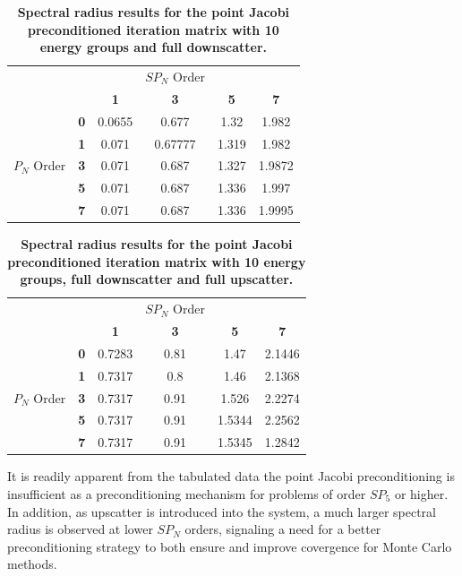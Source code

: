 \begin{table}[t!]
  \begin{center}
    \begin{tabular}{cccccc}\hline\hline
      \multicolumn{1}{c}{}& 
      \multicolumn{1}{c}{}& 
      \multicolumn{1}{c}{}& 
      \multicolumn{1}{c}{$SP_N$ Order}& 
      \multicolumn{1}{c}{}& 
      \multicolumn{1}{c}{} \\
       &   & \textbf{1} & \textbf{3} & \textbf{5} & \textbf{7}  \\
       & \textbf{0} & 0.0655 & 0.677 & 1.32 & 1.982 \\
       & \textbf{1} & 0.071 & 0.67777 & 1.319 & 1.982 \\
      $P_N$ Order & \textbf{3} & 0.071 & 0.687 & 1.327 & 1.9872 \\
       & \textbf{5} & 0.071 & 0.687 & 1.336 & 1.997 \\
       & \textbf{7} & 0.071 & 0.687 & 1.336 & 1.9995 \\
      \hline\hline
    \end{tabular}
  \end{center}
  \caption{\textbf{Spectral radius results for the point Jacobi
      preconditioned iteration matrix with 10 energy groups and full
      downscatter.}}
  \label{tab:group10dspj}
\end{table}
\begin{table}[t!]
  \begin{center}
    \begin{tabular}{cccccc}\hline\hline
      \multicolumn{1}{c}{}& 
      \multicolumn{1}{c}{}& 
      \multicolumn{1}{c}{}& 
      \multicolumn{1}{c}{$SP_N$ Order}& 
      \multicolumn{1}{c}{}& 
      \multicolumn{1}{c}{} \\
       &   & \textbf{1} & \textbf{3} & \textbf{5} & \textbf{7}  \\
       & \textbf{0} & 0.7283 & 0.81 & 1.47 & 2.1446 \\
       & \textbf{1} & 0.7317 & 0.8 & 1.46 & 2.1368 \\
      $P_N$ Order & \textbf{3} & 0.7317 & 0.91 & 1.526 & 2.2274 \\
       & \textbf{5} & 0.7317 & 0.91 & 1.5344 & 2.2562 \\
       & \textbf{7} & 0.7317 & 0.91 & 1.5345 & 1.2842 \\
      \hline\hline
    \end{tabular}
  \end{center}
  \caption{\textbf{Spectral radius results for the point Jacobi
      preconditioned iteration matrix with 10 energy groups, full
      downscatter and full upscatter.}}
  \label{tab:group10uspj}
\end{table}
It is readily apparent from the tabulated data the point Jacobi
preconditioning is insufficient as a preconditioning mechanism for
problems of order $SP_5$ or higher. In addition, as upscatter is
introduced into the system, a much larger spectral radius is observed
at lower $SP_N$ orders, signaling a need for a better preconditioning
strategy to both ensure and improve covergence for Monte Carlo
methods. 

